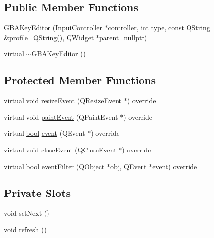 \subsection*{Public Member Functions}
\begin{DoxyCompactItemize}
\item 
\mbox{\hyperlink{class_q_g_b_a_1_1_g_b_a_key_editor_aed049193bfbbca0ad5d08277d111944c}{G\+B\+A\+Key\+Editor}} (\mbox{\hyperlink{class_q_g_b_a_1_1_input_controller}{Input\+Controller}} $\ast$controller, \mbox{\hyperlink{ioapi_8h_a787fa3cf048117ba7123753c1e74fcd6}{int}} type, const Q\+String \&profile=Q\+String(), Q\+Widget $\ast$parent=nullptr)
\item 
virtual \mbox{\hyperlink{class_q_g_b_a_1_1_g_b_a_key_editor_aa382ba1e6de362617296a3803cea41e7}{$\sim$\+G\+B\+A\+Key\+Editor}} ()
\end{DoxyCompactItemize}
\subsection*{Protected Member Functions}
\begin{DoxyCompactItemize}
\item 
virtual void \mbox{\hyperlink{class_q_g_b_a_1_1_g_b_a_key_editor_a38f5e33d0c9c1234395c4f3b0a6b0349}{resize\+Event}} (Q\+Resize\+Event $\ast$) override
\item 
virtual void \mbox{\hyperlink{class_q_g_b_a_1_1_g_b_a_key_editor_a5c53525fde95136dc8a5ef3cebd1b9bf}{paint\+Event}} (Q\+Paint\+Event $\ast$) override
\item 
virtual \mbox{\hyperlink{libretro_8h_a4a26dcae73fb7e1528214a068aca317e}{bool}} \mbox{\hyperlink{class_q_g_b_a_1_1_g_b_a_key_editor_a5e0ea82cb3b9547511dff167b10922a1}{event}} (Q\+Event $\ast$) override
\item 
virtual void \mbox{\hyperlink{class_q_g_b_a_1_1_g_b_a_key_editor_ab0aa3144558fdbc605a8dd04939dd670}{close\+Event}} (Q\+Close\+Event $\ast$) override
\item 
virtual \mbox{\hyperlink{libretro_8h_a4a26dcae73fb7e1528214a068aca317e}{bool}} \mbox{\hyperlink{class_q_g_b_a_1_1_g_b_a_key_editor_abc261b8e612c62279272378c2ddf58e6}{event\+Filter}} (Q\+Object $\ast$obj, Q\+Event $\ast$\mbox{\hyperlink{class_q_g_b_a_1_1_g_b_a_key_editor_a5e0ea82cb3b9547511dff167b10922a1}{event}}) override
\end{DoxyCompactItemize}
\subsection*{Private Slots}
\begin{DoxyCompactItemize}
\item 
void \mbox{\hyperlink{class_q_g_b_a_1_1_g_b_a_key_editor_a47519b2e40e296040c86c6a9018645ca}{set\+Next}} ()
\item 
void \mbox{\hyperlink{class_q_g_b_a_1_1_g_b_a_key_editor_ab32fdd08ededd70914682b14b4f4c127}{refresh}} ()
\end{DoxyCompactItemize}
